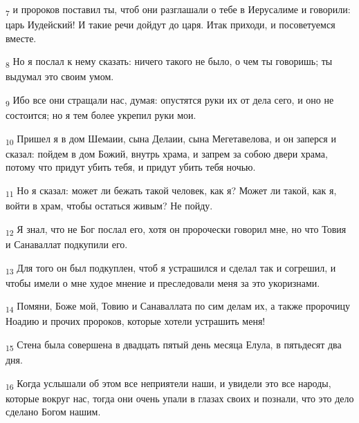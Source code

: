 \begin{tcolorbox}
\textsubscript{7} и пророков поставил ты, чтоб они разглашали о тебе в Иерусалиме и говорили: царь Иудейский! И такие речи дойдут до царя. Итак приходи, и посоветуемся вместе.
\end{tcolorbox}
\begin{tcolorbox}
\textsubscript{8} Но я послал к нему сказать: ничего такого не было, о чем ты говоришь; ты выдумал это своим умом.
\end{tcolorbox}
\begin{tcolorbox}
\textsubscript{9} Ибо все они стращали нас, думая: опустятся руки их от дела сего, и оно не состоится; но я тем более укрепил руки мои.
\end{tcolorbox}
\begin{tcolorbox}
\textsubscript{10} Пришел я в дом Шемаии, сына Делаии, сына Мегетавелова, и он заперся и сказал: пойдем в дом Божий, внутрь храма, и запрем за собою двери храма, потому что придут убить тебя, и придут убить тебя ночью.
\end{tcolorbox}
\begin{tcolorbox}
\textsubscript{11} Но я сказал: может ли бежать такой человек, как я? Может ли такой, как я, войти в храм, чтобы остаться живым? Не пойду.
\end{tcolorbox}
\begin{tcolorbox}
\textsubscript{12} Я знал, что не Бог послал его, хотя он пророчески говорил мне, но что Товия и Санаваллат подкупили его.
\end{tcolorbox}
\begin{tcolorbox}
\textsubscript{13} Для того он был подкуплен, чтоб я устрашился и сделал так и согрешил, и чтобы имели о мне худое мнение и преследовали меня за это укоризнами.
\end{tcolorbox}
\begin{tcolorbox}
\textsubscript{14} Помяни, Боже мой, Товию и Санаваллата по сим делам их, а также пророчицу Ноадию и прочих пророков, которые хотели устрашить меня!
\end{tcolorbox}
\begin{tcolorbox}
\textsubscript{15} Стена была совершена в двадцать пятый день месяца Елула, в пятьдесят два дня.
\end{tcolorbox}
\begin{tcolorbox}
\textsubscript{16} Когда услышали об этом все неприятели наши, и увидели это все народы, которые вокруг нас, тогда они очень упали в глазах своих и познали, что это дело сделано Богом нашим.
\end{tcolorbox}

